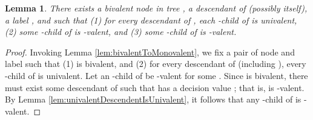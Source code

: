 \documentclass[11pt]{article}
\numberwithin{theorem}{section}
\newtheorem{lemma}[theorem]{Lemma}
\begin{document}
\begin{lemma}\label{lem:bivalentTo1ValentAnd0Valent}
 There exists a bivalent node  in tree , a descendant  of  (possibly  itself), a label , and  such that (1) 
 for every descendant  of , each -child of  is univalent, (2) some -child of  is -valent, and (3) some -child of  is -valent.
\end{lemma}
\begin{proof}
Invoking Lemma \ref{lem:bivalentToMonovalent}, we fix a pair  of node  and label  such that (1)  is bivalent, and (2) for every descendant  of  (including ), every -child of  is univalent. Let an -child of  be -valent for some . Since  is bivalent, there must exist some descendant  of  such that  has a decision value ; that is,  is -valent. By Lemma \ref{lem:univalentDescendentIsUnivalent}, it follows that any -child of  is -valent.
\end{proof}
\end{document}
